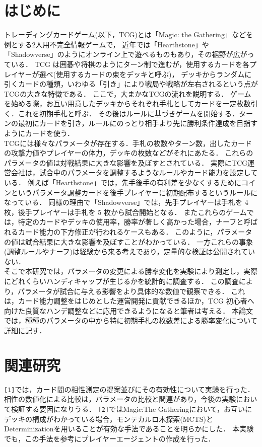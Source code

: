 \documentclass[twocolumn]{ltjsarticle}
\begin{document}
\section{はじめに}
\small{
  トレーディングカードゲーム(以下，TCG)とは「Magic: the Gathering」などを例とする2人用不完全情報ゲームで，
  近年では「Hearthstone」や「Shadowverse」のようにオンライン上で遊べるものもあり，その裾野が広がっている．%
  TCG は囲碁や将棋のようにターン制で進むが，使用するカードを各プレイヤーが選べ(使用するカードの束をデッキと呼ぶ)，
  デッキからランダムに引くカードの種類，いわゆる「引き」により戦局や戦略が左右されるという点がTCGの大きな特徴である．
  ここで，大まかなTCGの流れを説明する．%
  ゲームを始める際，お互い用意したデッキからそれぞれ手札としてカードを一定枚数引く．これを初期手札と呼ぶ．
  その後はルールに基づきゲームを開始する．ターンの最初にカードを引き，ルールにのっとり相手より先に勝利条件達成を目指すようにカードを使う．
\\TCGには様々なパラメータが存在する．手札の枚数やターン数，出したカードの攻撃力値やプレイヤーの体力，デッキの枚数などがそれにあたる．
  これらのパラメータの値は対戦結果に大きな影響を及ぼすとされている．
  実際にTCG運営会社は，試合中のパラメータを調整するようなルールやカード能力を設定している．
  例えば「Hearthstone」では，先手後手の有利差を少なくするためにコインというパラメータ調整カードを後手プレイヤーに初期配布するというルールになっている．
  同様の理由で「Shadowverse」では，先手プレイヤーは手札を 4 枚，後手プレイヤーは手札を 5 枚から試合開始となる．
  またこれらのゲームでは，特定のカードやデッキの使用率，勝率が著しく高かった場合，ナーフと呼ばれるカード能力の下方修正が行われるケースもある．
  このように，パラメータの値は試合結果に大きな影響を及ぼすことがわかっている．
  一方これらの事象(調整ルールやナーフ)は経験から来る考えであり，定量的な検証は公開されていない．
\\そこで本研究では，パラメータの変更による勝率変化を実験により測定し，実際にどれくらいハンディキャップが生じるかを統計的に調査する．
  この調査により，パラメータが試合に与える影響をより具体的な数値で観察できる．%
  これは，カード能力調整をはじめとした運営開発に貢献できるほか，TCG 初心者へ向けた良質なハンデ調整などに応用できるようになると筆者は考える．
  本論文では，種種のパラメータの中から特に初期手札の枚数差による勝率変化について詳細に記す．
}
\section{関連研究}
\small{
  \verb#[1]#では，カード間の相性測定の提案並びにその有効性について実験を行った．
  相性の数値化による比較は，パラメータの比較と関連があり，今後の実験において検証する要因になりうる．
  \verb#[2]#ではMagic:The Gatheringにおいて，お互いにデッキの構成がわかっている場合，モンテカルロ木探索(MCTS)とDeterminizationを用いることが有効な手法であることを明らかにした．
  本実験でも，この手法を参考にプレイヤーエージェントの作成を行った．
}
\end{document}
